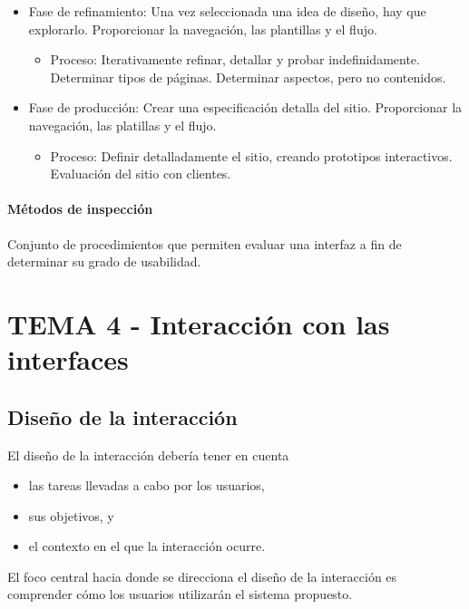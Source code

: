\documentclass[12pt, twoside, openright]{report} %
\begin{document}
\begin{itemize}
\begin{itemize}
		      \item Fase de refinamiento: Una vez seleccionada una idea de diseño, hay que explorarlo. Proporcionar la navegación, las plantillas y el flujo.
		            \begin{itemize}
			            \item Proceso: Iterativamente refinar, detallar y probar indefinidamente. Determinar tipos de páginas. Determinar aspectos, pero no contenidos.\end{itemize}
		      \item Fase de producción: Crear una especificación detalla del sitio. Proporcionar la navegación, las platillas y el flujo.
		            \begin{itemize}
			            \item Proceso: Definir detalladamente el sitio, creando prototipos interactivos. Evaluación del sitio con clientes.\end{itemize}
	      \end{itemize}
\end{itemize}



\subsubsection{Métodos de inspección} Conjunto de procedimientos que permiten
evaluar una interfaz a fin de determinar su grado de usabilidad.

\chapter{TEMA 4 - Interacción con las interfaces}

\section{Diseño de la interacción}

El diseño de la interacción debería tener en cuenta

\begin{itemize}
	\item las tareas llevadas a cabo por los usuarios,
	\item sus objetivos, y
	\item el contexto en el que la interacción ocurre.
\end{itemize}

El foco central hacia donde se direcciona el diseño de la
interacción es comprender cómo los usuarios utilizarán el sistema
propuesto.
\end{document}
